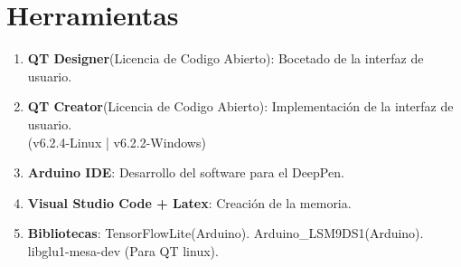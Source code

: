 \chapter{Herramientas}

\begin{mimargen}{-0.5cm}{-1.8cm}

        
    \begin{enumerate}
        \item \textbf{QT Designer}({\tiny Licencia de Codigo Abierto}):
        Bocetado de la interfaz de usuario.
        \item \textbf{QT Creator}({\tiny Licencia de Codigo Abierto}):
        Implementación de la interfaz de usuario.\\
        (v6.2.4-Linux | v6.2.2-Windows)
        \item \textbf{Arduino IDE}: Desarrollo del software para el DeepPen.
        \item \textbf{Visual Studio Code + Latex}: Creación de la memoria.
        \item \textbf{Bibliotecas}:
        \subitem TensorFlowLite(Arduino).
        \subitem Arduino\_LSM9DS1(Arduino).
        \subitem libglu1-mesa-dev (Para QT linux).
    \end{enumerate}



\end{mimargen}